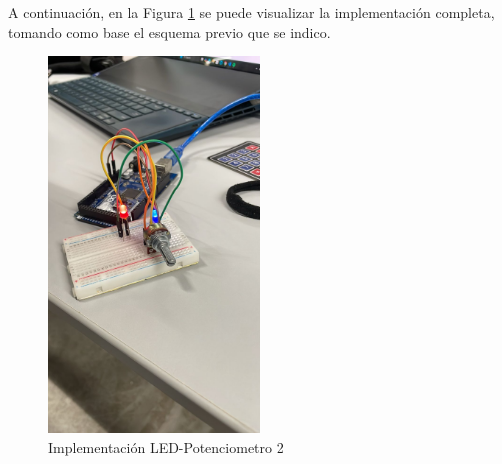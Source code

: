 \documentclass{article}
\begin{document}
A continuación, en la Figura \ref{img:chkp-3-4-2} se puede visualizar la implementación completa, tomando como base el esquema previo que se indico.

\begin{figure}[H]
    \centering
    \includegraphics[width=0.50\textwidth]{./img/chkp-3-4-2.jpeg}
    \caption{Implementación LED-Potenciometro 2}
    \label{img:chkp-3-4-2}
\end{figure}
\end{document}
